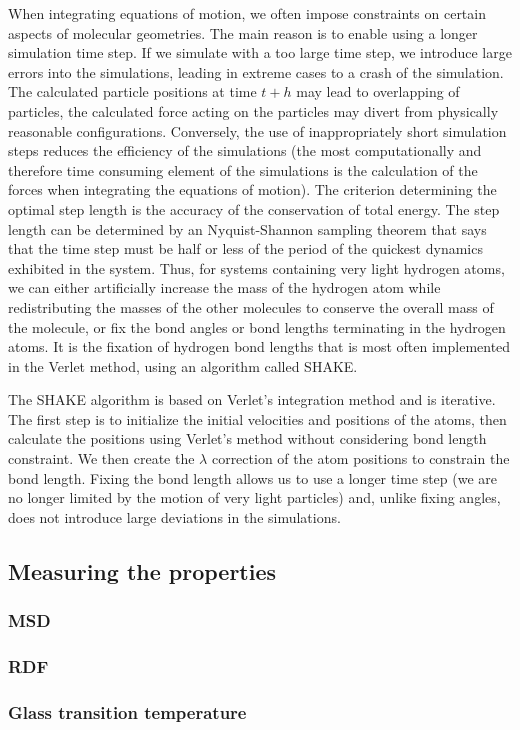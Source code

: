 When integrating equations of motion, we often impose constraints on certain aspects of molecular geometries. The main reason is to enable using a longer simulation time step. If we simulate with a too large time step, we introduce large errors into the simulations, leading in extreme cases to a crash of the simulation. The calculated particle positions at time $t+h$ may lead to overlapping of particles, the calculated force acting on the particles may divert from physically reasonable configurations. Conversely, the use of inappropriately short simulation steps reduces the efficiency of the simulations (the most computationally and therefore time consuming element of the simulations is the calculation of the forces when integrating the equations of motion). \cite{mdskripta} The criterion determining the optimal step length is the accuracy of the conservation of total energy. The step length can be determined by an Nyquist-Shannon \cite{shannon_communication_1949} sampling theorem that says that the time step must be half or less of the period of the quickest dynamics exhibited in the system. Thus, for systems containing very light hydrogen atoms, we can either artificially increase the mass of the hydrogen atom while redistributing the masses of the other molecules to conserve the overall mass of the molecule, or fix the bond angles or bond lengths terminating in the hydrogen atoms. It is the fixation of hydrogen bond lengths that is most often implemented in the Verlet method, using an algorithm called SHAKE. 

The SHAKE algorithm is based on Verlet's integration method and is iterative. The first step is to initialize the initial velocities and positions of the atoms, then calculate the positions using Verlet's method without considering bond length constraint. We then create the $\lambda$ correction of the atom positions to constrain the bond length. Fixing the bond length allows us to use a longer time step (we are no longer limited by the motion of very light particles) and, unlike fixing angles, does not introduce large deviations in the simulations.

\subsection{Measuring the properties}
\subsubsection{MSD}
\subsubsection{RDF}
\subsubsection{Glass transition temperature}
